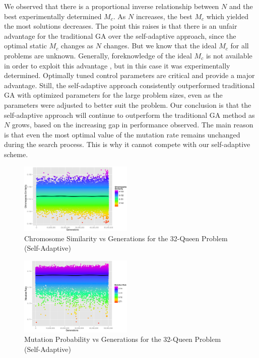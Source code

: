\documentclass[conference]{IEEEtran}
\begin{document}
We observed that there is a proportional inverse relationship between $N$ and the best experimentally determined $M_{c}$. As $N$ increases, the best $M_{c}$ which yielded the most solutions decreases. The point this raises is that there is an unfair advantage for the traditional GA over the self-adaptive approach, since the optimal static $M_{c}$ changes as $N$ changes. But we know that the ideal $M_{c}$ for all problems are unknown. Generally, foreknowledge of the ideal $M_{c}$ is not available in order to exploit this advantage \cite{cit:14}, but in this case it was experimentally determined. Optimally tuned control parameters are critical and provide a major advantage. Still, the self-adaptive approach consistently outperformed traditional GA with optimized parameters for the large problem sizes, even as the parameters were adjusted to better suit the problem. Our conclusion is that the self-adaptive approach will continue to outperform the traditional GA method as $N$ grows, based on the increasing gap in performance observed. The main reason is that even the most optimal value of the mutation rate remains unchanged during the search process. This is why it cannot compete with our self-adaptive scheme.

\begin{figure}[htp]
\centerline{\includegraphics[width=0.48\textwidth]{figures/similarity_variable_32q_3.png}}
\caption{Chromosome Similarity vs Generations for the 32-Queen Problem (Self-Adaptive)} 
\label{fig:sim32q}
\end{figure}

\begin{figure}[htp]
\centerline{\includegraphics[width=0.48\textwidth]{figures/mutation_32q_3.png}}
\caption{Mutation Probability vs Generations for the 32-Queen Problem (Self-Adaptive)} 
\label{fig:mutation32q}
\end{figure}
\end{document}
